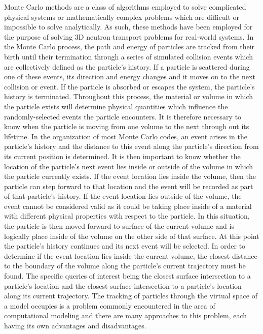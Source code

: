 \documentclass[12pt, a4paper]{article}
\begin{document}

Monte Carlo methods are a class of algorithms employed to solve complicated physical systems or mathematically complex problems which are difficult or impossible to solve analytically. As such, these methods have been employed for the purpose of solving 3D neutron transport problems for real-world systems. In the Monte Carlo process, the path and energy of particles are tracked from their birth until their termination through a series of simulated collision events which are collectively defined as the particle's history. If a particle is scattered during one of these events, its direction and energy changes and it moves on to the next collision or event. If the particle is absorbed or escapes the system, the particle's history is terminated. Throughout this process, the material or volume in which the particle exists will determine physical quantities which influence the randomly-selected events the particle encounters. It is therefore necessary to know when the particle is moving from one volume to the next through out its lifetime. In the organization of most Monte Carlo codes, an event arises in the particle's history and the distance to this event along the particle's direction from its current position is determined. It is then important to know whether the location of the particle's next event lies inside or outside of the volume in which the particle currently exists. If the event location lies inside the volume, then the particle can step forward to that location and the event will be recorded as part of that particle's history. If the event location lies outside of the volume, the event cannot be considered valid as it could be taking place inside of a material with different physical properties with respect to the particle. In this situation, the particle is then moved forward to surface of the current volume and is logically place inside of the volume on the other side of that surface. At this point the particle's history continues and its next event will be selected. In order to determine if the event location lies inside the current volume, the closest distance to the boundary of the volume along the particle's current trajectory must be found. The specific queries of interest being the closest surface intersection to a particle's location and the closest surface intersection to a particle's location along its current trajectory. The tracking of particles through the virtual space of a model occupies is a problem commonly encountered in the area of computational modeling and there are many approaches to this problem, each having its own advantages and disadvantages.
\end{document}
